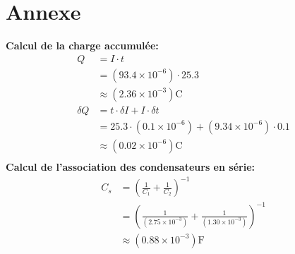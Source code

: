\documentclass[11pt]{article}
\begin{document}
\section{Annexe}
\bf Calcul de la charge accumulée:
\begin{equation*}
\begin{split}
       Q&= I\cdot t\\
        &= (93.4\times 10^{-6})\cdot 25.3\\
        &\approx (2.36\times 10^{-3})\mathrm C\\
\delta Q&= t\cdot\delta I+I\cdot\delta t\\
        &= 25.3\cdot (0.1\times 10^{-6})+(9.34\times 10^{-6})\cdot 0.1\\
        &\approx (0.02\times 10^{-6})\mathrm C\\
\end{split}
\end{equation*}
\bf Calcul de l'association des condensateurs en série:
\begin{equation*}
\begin{split}
       C_{s}&= \left (\frac{1}{C_{1}}+\frac{1}{C_{2}}\right )^{-1}\\
            &= \left (\frac{1}{(2.75\times 10^{-3})}+\frac{1}{(1.30\times 10^{-3})}\right )^{-1}\\
            &\approx (0.88\times 10^{-3})\mathrm F\\
\end{split}
\end{equation*}
\end{document}
